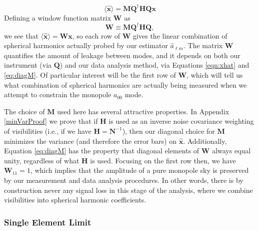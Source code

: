 \documentclass[twocolumn,apj,numberedappendix]{emulateapj}
\newcommand{\x}{\mathbf{x}}
\newcommand{\xhat}{\hat{\mathbf{x}}}
\newcommand{\N}{\mathbf{N}}
\newcommand{\Hmat}{\mathbf{H}}
\newcommand{\Q}{\mathbf{Q}}
\newcommand{\M}{\mathbf{M}}
\newcommand{\W}{\mathbf{W}}
\newcommand{\acl}[1]{}
\newcommand{\mep}[1]{}
\begin{document}
\begin{equation}
\langle \xhat \rangle = \M \Q^\dagger \Hmat \Q \x
\end{equation}
Defining a window function matrix $\W$ as 
\begin{equation}
\W \equiv \M \Q^\dagger \Hmat \Q,
\label{eq:Wform}
\end{equation}
we see that $\langle \xhat \rangle  = \W \mathbf{x}$, so each row of $\W$ gives the linear combination of spherical harmonics actually probed by our estimator $\hat{a}_{\ell m}$. The matrix $\W$ quantifies the amount of leakage between modes, and it depends on both our instrument (via $\Q$) and our data analysis method, via Equations \eqref{eqn:xhat} and \eqref{eq:diagM}. Of particular interest will be the first row of $\W$, which will tell us what combination of spherical harmonics are actually being measured when we attempt to constrain the monopole $a_{00}$ mode.

The choice of $\M$ used here has several attractive properties. In Appendix \ref{minVarProof} we prove that if $\Hmat$ is used as an inverse noise covariance weighting of visibilities (i.e., if we have $\Hmat = \N^{-1}$), then our diagonal choice for $\M$ minimizes the variance (and therefore the error bars) on $\mathbf{\hat{x}}$. Additionally, Equation \eqref{eq:diagM} has the property that diagonal elements of $\W$ always equal unity, regardless of what $\Hmat$ is used. Focusing on the first row then, we have $\W_{11} =1$, which implies that the amplitude of a pure monopole sky is preserved by our measurement and data analysis procedures. In other words, there is by construction never any signal loss in this stage of the analysis, where we combine visibilities into spherical harmonic coefficients.
%
%

\subsubsection{Single Element Limit}
\end{document}
